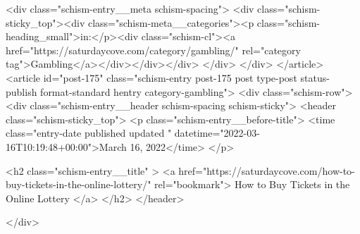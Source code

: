 {		<div class="schism-entry__meta schism-spacing">			<div class="schism-sticky_top"><div class="schism-meta__categories"><p class="schism-heading_small">in:</p><div class="schism-cl"><a href="https://saturdaycove.com/category/gambling/" rel="category tag">Gambling</a></div></div></div>		</div>
	</div>
</article>
<article id="post-175" class="schism-entry post-175 post type-post status-publish format-standard hentry category-gambling">
	<div class="schism-row">		<div class="schism-entry__header schism-spacing schism-sticky">			<header class="schism-sticky_top">				<p class="schism-entry__before-title">
					<time class="entry-date published updated " datetime="2022-03-16T10:19:48+00:00">March 16, 2022</time>				</p>

				<h2 class="schism-entry__title" >
					<a href="https://saturdaycove.com/how-to-buy-tickets-in-the-online-lottery/" rel="bookmark">
						How to Buy Tickets in the Online Lottery					</a>
				</h2>
			</header>

					</div>

}
